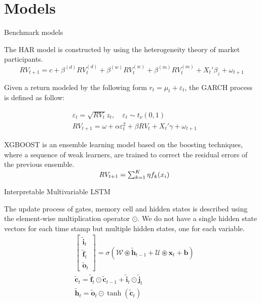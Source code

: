 \section{Models}


\begin{frame}{Benchmark models}

The HAR model is constructed by using the heterogeneity theory of market participants.
\begin{equation}
    \label{eq:har}
    RV_{t+1} = c + \beta^{(d)} RV^{(d)}_{t} + \beta^{(w)} RV^{(w)}_{t} + \beta^{(m)} RV^{(m)}_{t} + X_t' \beta_z + \omega_{t+1}
\end{equation}


Given a return modeled by the following form $r_t = \mu_t + \varepsilon_t$, the GARCH 
process is defined as follow:

\begin{equation}
  \begin{aligned}
  &\varepsilon_t = \sqrt{RV_t} z_t, \quad \varepsilon_t \sim t_\nu(0,1)\\
  &RV_{t+1} = \omega + \alpha \varepsilon_{t}^2 + \beta RV_{t} +  X_{t}' \gamma + \omega_{t+1}
  \end{aligned}
\end{equation}


XGBOOST is an ensemble learning model based on the boosting techniques, where 
a sequence of weak learners, are trained to correct the residual errors of the previous ensemble.\\
$\hspace{47mm} RV_{t+1} = \sum_{k=1}^{K} \eta f_k(x_i)$

    
\end{frame}



\begin{frame}{Interpretable Multivariable LSTM}

The update process of gates, memory cell and hidden states is described using the element-wise multiplication operator $\odot$.
We do not have a single hidden state vectors for each time stamp but multiple hidden states, one for each variable. 
\begin{equation}
  \label{eq:imv_lstm}
  \begin{aligned}
& {\left[\begin{array}{c}
\tilde{\mathbf{i}}_t \\
\tilde{\mathbf{f}}_t \\
\tilde{\mathbf{o}}_t
\end{array}\right]=\sigma\left(\mathcal{W} \circledast \tilde{\mathbf{h}}_{t-1}+\mathcal{U} \circledast \mathbf{x}_t+\mathbf{b}\right)} \\
& \tilde{\mathbf{c}}_t=\tilde{\mathbf{f}}_t \odot \tilde{\mathbf{c}}_{t-1}+\tilde{\mathbf{i}}_t \odot \tilde{\mathbf{j}}_t \\
& \tilde{\mathbf{h}}_t=\tilde{\mathbf{o}}_t \odot \tanh \left(\tilde{\mathbf{c}}_t\right)
\end{aligned}
\end{equation}



\end{frame}



